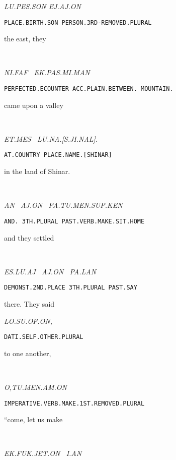 {{\it LU.PES.SON 	EJ.AJ.ON }

{\tt PLACE.BIRTH.SON	PERSON.3RD-REMOVED.PLURAL }

the east, 		they 		 


\drie 


\Atlanni\faf~\ek\pas\mi\man

{\it NI.FAF~                                EK.PAS.MI.MAN }

{\tt PERFECTED.ECOUNTER  	ACC.PLAIN.BETWEEN. MOUNTAIN.	}

came upon 		a valley                 


\drie  


\et\mes~\lu\na\cartouche{\Atlans\ji\nal}\period

{\it ET.MES~		LU.NA.[S.JI.NAL]. }

{\tt AT.COUNTRY	PLACE.NAME.[SHINAR] }

in the land          of Shinar. 

\drie



\an~\aj\on~\pa\tu\men\Atlansup\ken

{\it AN~	AJ.ON~   PA.TU.MEN.SUP.KEN }

{\tt AND.	3TH.PLURAL	PAST.VERB.MAKE.SIT.HOME	 }

and 	they 		settled			 

\drie
  


\es\lu\aj~\period \aj\on~\pa\lan

{\it ES.LU.AJ~		AJ.ON~		PA.LAN	 }

{\tt DEMONST.2ND.PLACE	3TH.PLURAL	PAST.SAY }

there.			They		said 	 

\drie 


\lo\su\of\on\comma

{\it LO.SU.OF.ON, }

{\tt DATI.SELF.OTHER.PLURAL		 }
 
to one another, 			 
\drie 



  

\Atlano\comma\tu\men\am\on\

{\it O,TU.MEN.AM.ON }

{\tt IMPERATIVE.VERB.MAKE.1ST.REMOVED.PLURAL }

“come, let us make   


\drie 


\ek\fuk\jet\on\comma\Atlani\an\

{\it EK.FUK.JET.ON~			I.AN }

}
